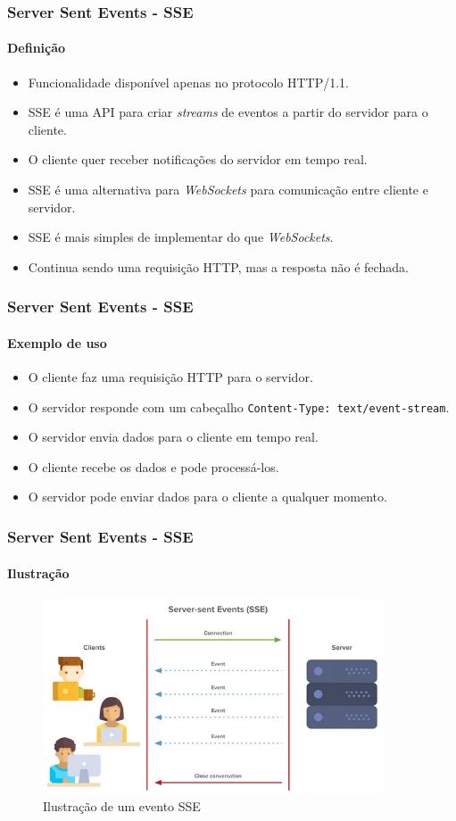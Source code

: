 \documentclass[
	9pt, %
	t, %
]{beamer}
\newcommand{\yellowbox}[1]{\colorbox{yellow!75}{#1}}
\begin{document}
\begin{frame}
	\frametitle{Server Sent Events - SSE}
	\framesubtitle{Definição}

	\begin{itemize}
		\item Funcionalidade disponível apenas no protocolo HTTP/1.1.
		\item SSE é uma API para criar \textit{streams} de eventos \yellowbox{a partir do servidor} para o cliente.
		\item O cliente quer receber notificações do servidor em \yellowbox{tempo real}.
		\item SSE é uma alternativa para \textit{WebSockets} para comunicação entre cliente e servidor.
		\item SSE é mais simples de implementar do que \textit{WebSockets}.
		\item Continua sendo uma requisição HTTP, mas a resposta não é fechada.
	\end{itemize}

\end{frame}

\begin{frame}
	\frametitle{Server Sent Events - SSE}
	\framesubtitle{Exemplo de uso}

	\begin{itemize}
		\item O cliente faz uma requisição HTTP para o servidor.
		\item O servidor responde com um cabeçalho \texttt{Content-Type: text/event-stream}.
		\item O servidor envia dados para o cliente \yellowbox{em tempo real}.
		\item O cliente recebe os dados e pode processá-los.
		\item O servidor pode enviar dados para o cliente \yellowbox{a qualquer momento}.
	\end{itemize}

\end{frame}

\begin{frame}
	\frametitle{Server Sent Events - SSE}
	\framesubtitle{Ilustração}

	\begin{figure}
		\centering
		\includegraphics[width=0.9\textwidth]{sse.png}
		\caption{Ilustração de um evento SSE}
	\end{figure}

\end{frame}
\end{document}

